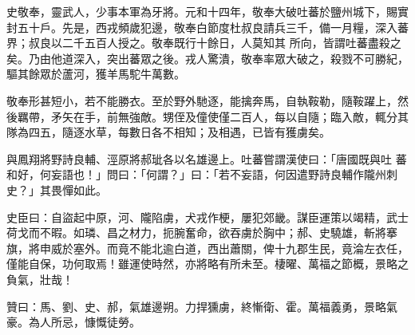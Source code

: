 \begin{pinyinscope}
 史敬奉，靈武人，少事本軍為牙將。元和十四年，敬奉大破吐蕃於鹽州城下，賜實封五十戶。先是，西戎頻歲犯邊，敬奉白節度杜叔良請兵三千，備一月糧，深入蕃界；叔良以二千五百人授之。敬奉既行十餘日，人莫知其
 所向，皆謂吐蕃盡殺之矣。乃由他道深入，突出蕃眾之後。戎人驚潰，敬奉率眾大破之，殺戮不可勝紀，驅其餘眾於蘆河，獲羊馬駝牛萬數。



 敬奉形甚短小，若不能勝衣。至於野外馳逐，能擒奔馬，自執鞍勒，隨鞍躍上，然後羈帶，矛矢在手，前無強敵。甥侄及僮使僅二百人，每以自隨；臨入敵，輒分其隊為四五，隨逐水草，每數日各不相知；及相遇，已皆有獲虜矣。



 與鳳翔將野詩良輔、涇原將郝玼各以名雄邊上。吐蕃嘗謂漢使曰：「唐國既與吐
 蕃和好，何妄語也！」問曰：「何謂？」曰：「若不妄語，何因遣野詩良輔作隴州刺史？」其畏憚如此。



 史臣曰：自盜起中原，河、隴陷虜，犬戎作梗，屢犯郊畿。謀臣運策以竭精，武士荷戈而不暇。如璘、昌之材力，扼腕奮命，欲吞虜於胸中；郝、史驍雄，斬將搴旗，將申威於塞外。而竟不能北逾白道，西出蕭關，俾十九郡生民，竟淪左衣任，僅能自保，功何取焉！雖運使時然，亦將略有所未至。棲曜、萬福之節概，景略之負氣，壯哉！



 贊曰：馬、劉、史、郝，氣雄邊朔。力捍獯虜，終慚衛、霍。萬福義勇，景略氣豪。為人所忌，慷慨徒勞。



\end{pinyinscope}